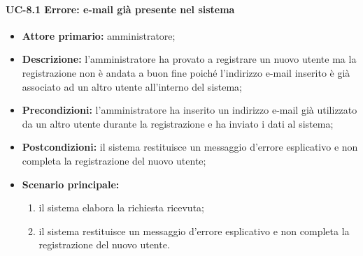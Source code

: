     \paragraph{UC-8.1 Errore: e-mail già presente nel sistema}
    \begin{itemize}
        \item \textbf{Attore primario:} amministratore;
    
        \item \textbf{Descrizione:} l'amministratore ha provato a registrare un nuovo utente ma la registrazione non è andata a buon fine poiché l'indirizzo e-mail inserito è già associato ad un altro utente all'interno del sistema;
    
        \item \textbf{Precondizioni:} l'amministratore ha inserito un indirizzo e-mail già utilizzato da un altro utente durante la registrazione e ha inviato i dati al sistema;
    
        \item \textbf{Postcondizioni:} il sistema restituisce un messaggio d'errore esplicativo e non completa la registrazione del nuovo utente;
    
        \item \textbf{Scenario principale:}
              \begin{enumerate}
                  \item il sistema elabora la richiesta ricevuta;
                  \item il sistema restituisce un messaggio d'errore esplicativo e non completa la registrazione del nuovo utente.
              \end{enumerate}
    \end{itemize}

